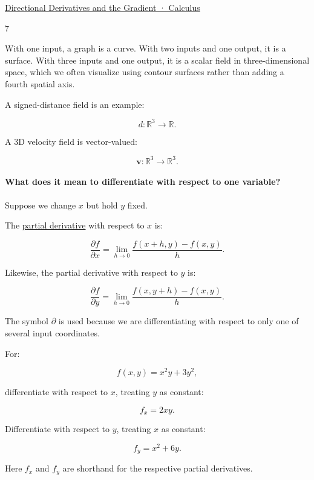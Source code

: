 \href{https://images.openai.com/static-rsc-4/MtStZWdgED9mKU6EnkX1k_zlh4L3TWo-GNfhGqa5OirCu2UqgHU1RDOc_KWqWGx4LvoxpyNeJD9le0CUU_moeDOftB-Tv5JU_33TqQg3AYkU_y2mzNrrzsQlPUtGln7B37nN0ug6FVtEWCW8T5tMoWrpR9uHgd9H2YPZXXUQm74?purpose=inline}{Directional Derivatives and the Gradient · Calculus}

7

With one input, a graph is a curve. With two inputs and one output, it is a surface. With three inputs and one output, it is a scalar field in three-dimensional space, which we often visualize using contour surfaces rather than adding a fourth spatial axis.

A signed-distance field is an example:

\[
d:\mathbb R^3\rightarrow\mathbb R.
\]

A 3D velocity field is vector-valued:

\[
\mathbf v:\mathbb R^3\rightarrow\mathbb R^3.
\]

\paragraph{What does it mean to differentiate with respect to one variable?}\label{02-foundations-ii-ch021-what-does-it-mean-to-differentiate-with-respect-to-one-variable}

Suppose we change \(x\) but hold \(y\) fixed.

The \hyperref[02-foundations-ii-ch021-multivariable-derivatives-and-sensitivity-1]{partial derivative} with respect to \(x\) is:

\[
\frac{\partial f}{\partial x} = \lim_{h\to0} \frac{f(x+h,y)-f(x,y)}h.
\]

Likewise, the partial derivative with respect to \(y\) is:

\[
\frac{\partial f}{\partial y} = \lim_{h\to0} \frac{f(x,y+h)-f(x,y)}h.
\]

The symbol \(\partial\) is used because we are differentiating with respect to only one of several input coordinates.

For:

\[
f(x,y)=x^2y+3y^2,
\]

differentiate with respect to \(x\), treating \(y\) as constant:

\[
\boxed{f_x=2xy}.
\]

Differentiate with respect to \(y\), treating \(x\) as constant:

\[
\boxed{f_y=x^2+6y}.
\]

Here \(f_x\) and \(f_y\) are shorthand for the respective partial derivatives.

